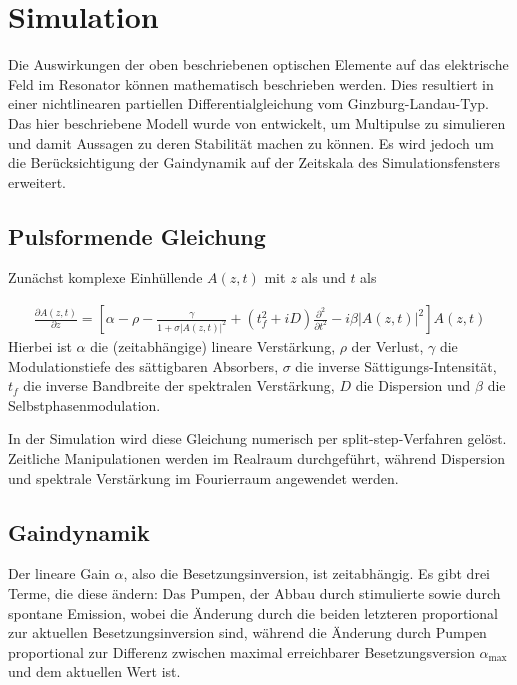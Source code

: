 \documentclass[bachelor,       %
               twoside,        %
               BCOR10mm,       %
               english,ngerman, %
               ]{GAUBM}
\begin{document}
\section{Simulation}
Die Auswirkungen der oben beschriebenen optischen Elemente auf das elektrische Feld im Resonator können mathematisch beschrieben werden.
Dies resultiert in einer nichtlinearen partiellen Differentialgleichung vom Ginzburg-Landau-Typ.
Das hier beschriebene Modell wurde von \cite{kalashnikov_multipulse_2003} entwickelt, um Multipulse zu simulieren und damit Aussagen zu deren Stabilität machen zu können.
Es wird jedoch um die Berücksichtigung der Gaindynamik auf der Zeitskala des Simulationsfensters erweitert.


\subsection{Pulsformende Gleichung}
Zunächst komplexe Einhüllende $A(z,t)$ mit $z$ als und $t$ als 

\begin{align}
	\frac{\partial A(z,t)}{\partial z}=\left[\alpha-\rho-\frac{\gamma}{1+\sigma|A(z,t)|^2}+(t_f^2+iD)\frac{\partial^2}{\partial t^2}-i\beta |A(z,t)|^2\right]A(z,t)
\end{align}
Hierbei ist $\alpha$ die (zeitabhängige) lineare Verstärkung, $\rho$ der Verlust, $\gamma$ die Modulationstiefe des sättigbaren Absorbers, $\sigma$ die inverse Sättigungs-Intensität, $t_f$ die inverse Bandbreite der spektralen Verstärkung, $D$ die Dispersion und $\beta$ die Selbstphasenmodulation.

In der Simulation wird diese Gleichung numerisch per split-step-Verfahren gelöst.
Zeitliche Manipulationen werden im Realraum durchgeführt, während Dispersion und spektrale Verstärkung im Fourierraum angewendet werden.

\subsection{Gaindynamik}
Der lineare Gain $\alpha$, also die Besetzungsinversion, ist zeitabhängig.
Es gibt drei Terme, die diese ändern:
Das Pumpen, der Abbau durch stimulierte sowie durch spontane Emission, wobei die Änderung durch die beiden letzteren proportional zur aktuellen Besetzungsinversion sind, während die Änderung durch Pumpen proportional zur Differenz zwischen maximal erreichbarer Besetzungsversion $\alpha_\text{max}$ und dem aktuellen Wert ist.
\end{document}
